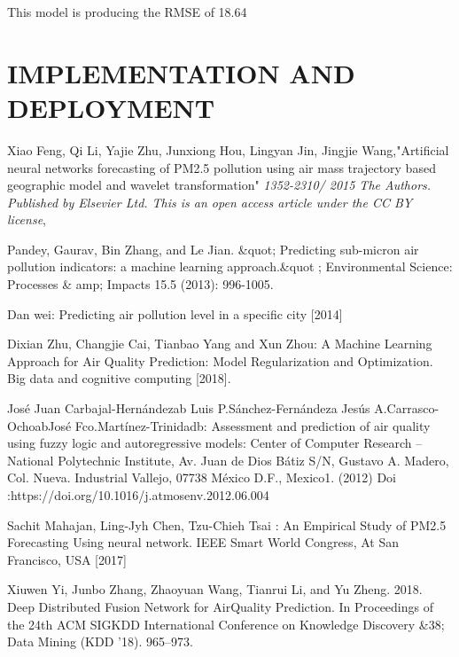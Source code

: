  This model is producing the RMSE of 18.64

\chapter{IMPLEMENTATION AND  DEPLOYMENT}

\clearpage
{}
\begin{thebibliography}{99}

Xiao Feng, Qi Li, Yajie Zhu, Junxiong Hou, Lingyan Jin, Jingjie Wang,"Artificial neural networks forecasting of PM2.5 pollution using air mass
trajectory based geographic model and wavelet transformation" {\em 1352-2310/ 2015 The Authors. Published by Elsevier Ltd. This is an open access article under the CC BY license}, 


Pandey, Gaurav, Bin Zhang, and Le Jian. \&quot; Predicting sub-micron air pollution indicators: a machine learning approach.\&quot ; Environmental Science: Processes \& amp; Impacts 15.5 (2013): 996-1005.

Dan wei: Predicting air pollution level in a specific city
[2014]

Dixian Zhu, Changjie Cai, Tianbao Yang and Xun Zhou: A
Machine Learning Approach for Air Quality Prediction:
Model Regularization and Optimization. Big data and
cognitive computing [2018].

José Juan Carbajal-Hernándezab Luis P.Sánchez-Fernándeza
Jesús A.Carrasco-OchoabJosé Fco.Martínez-Trinidadb:
Assessment and prediction of air quality using fuzzy logic
and autoregressive models: Center of Computer Research –
National Polytechnic Institute, Av. Juan de Dios Bátiz S/N,
Gustavo A. Madero, Col. Nueva. Industrial Vallejo, 07738
México D.F., Mexico1. (2012) Doi
:https://doi.org/10.1016/j.atmosenv.2012.06.004

Sachit Mahajan, Ling-Jyh Chen, Tzu-Chieh Tsai : An
Empirical Study of PM2.5 Forecasting Using neural network.
IEEE Smart World Congress, At San Francisco, USA [2017]

Xiuwen Yi, Junbo Zhang, Zhaoyuan Wang, Tianrui Li, and Yu Zheng. 2018. Deep
Distributed Fusion Network for AirQuality Prediction. In Proceedings of the 24th
ACM SIGKDD International Conference on Knowledge Discovery \&38; Data Mining (KDD ’18). 965–973.


\end{thebibliography}

